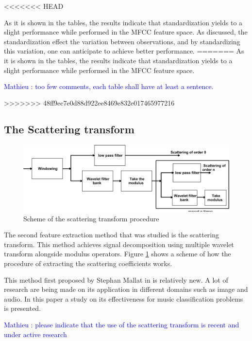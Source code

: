 \documentclass[hidelinks,12pt]{report}
\newcommand{\ml}[1]{\textcolor{blue}{ Mathieu : #1}}
\begin{document}
<<<<<<< HEAD


As it is shown in the tables, the results indicate that standardization yields to a slight performance while performed in the MFCC feature space. As discussed, the standardization effect the variation between observations, and by standardizing this variation, one can anticipate to achieve better performance.
=======
As it is shown in the tables, the results indicate that standardization yields to a slight performance while performed in the MFCC feature space.

\ml{too few comments, each table shall have at least a sentence.}

>>>>>>> 48ff9ec7e0d88d922ee8469e832e017465977216
\subsection{The Scattering transform}
\begin{figure}[t!]
  
  \centering
	    \includegraphics[width=1\textwidth]{scattering}
    \caption{Scheme of the scattering transform procedure }
    \label{scat}
\end{figure}
The second feature extraction method that was studied is the scattering transform. This method achieves signal decomposition using multiple wavelet transform alongside modulus operators. Figure \ref{scat} shows a scheme of how the procedure of extracting the scattering coefficients works.\par This method first proposed by Stephan Mallat in \cite{M10} is relatively new. A lot of research are being made on its application in different domains such as image and audio. In this paper a study on its effectiveness for music classification problems is presented.

\ml{please indicate that the use of the scattering transform is recent and under active research}
\end{document}
